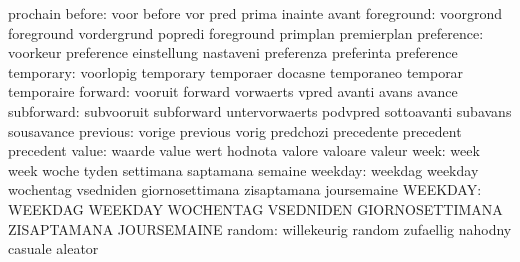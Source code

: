                            prochain
                   before: voor                      before
                           vor                       pred
                           prima                     inainte
                           avant
               foreground: voorgrond                 foreground
                           vordergrund               popredi
                           foreground                primplan
                           premierplan
               preference: voorkeur                  preference
                           einstellung               nastaveni
                           preferenza                preferinta
                           preference
                temporary: voorlopig                 temporary
                           temporaer                 docasne
                           temporaneo                temporar
                           temporaire
                  forward: vooruit                   forward
                           vorwaerts                 vpred
                           avanti                    avans
                           avance
               subforward: subvooruit                subforward
                           untervorwaerts            podvpred
                           sottoavanti               subavans
                           sousavance
                 previous: vorige                    previous
                           vorig                     predchozi
                           precedente                precedent
                           precedent
                    value: waarde                    value
                           wert                      hodnota
                           valore                    valoare
                           valeur
                     week: week                      week
                           woche                     tyden
                           settimana                 saptamana
                           semaine
                  weekday: weekdag                   weekday
                           wochentag                 vsedniden
                           giornosettimana           zisaptamana
                           joursemaine
                  WEEKDAY: WEEKDAG                   WEEKDAY
                           WOCHENTAG                 VSEDNIDEN
                           GIORNOSETTIMANA           ZISAPTAMANA
                           JOURSEMAINE
                   random: willekeurig               random
                           zufaellig                 nahodny
                           casuale                   aleator

